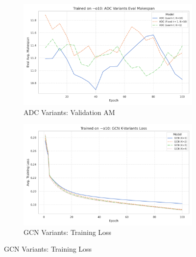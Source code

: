 \begin{figure}[htbp]
    \begin{subfigure}[b]{0.48\textwidth}
        \centering
        \includegraphics[width=\textwidth]{trainplotbase/TRAINED_ON_10_OBS/training_curves_focused/condition_o10/adc_variants_eval_am.png}
        \caption{ADC Variants: Validation AM}
        \label{fig:adc_val_am_10obs}
    \end{subfigure}
    \hfill
    \begin{subfigure}[b]{0.48\textwidth}
        \centering
        \includegraphics[width=\textwidth]{trainplotbase/TRAINED_ON_10_OBS/training_curves_focused/condition_o10/gcn_variants_train_loss.png}
        \caption{GCN Variants: Training Loss}
        \label{fig:gcn_train_loss_10obs}
    \end{subfigure}

    \vspace{0.3cm} 


\end{figure}
